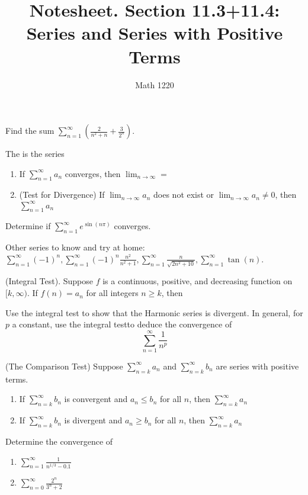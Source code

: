 \documentclass[12pt, a4paper]{article}
\author{Math 1220}
\title{Notesheet. Section 11.3+11.4: Series and Series with Positive Terms}
\date{}
\begin{document}
\maketitle
\nameline
\begin{ex}
  Find the sum \(\sum_{n=1}^\infty \left( \frac{2}{n^2+n} +
    \frac{3}{2^n} \right)\).
\end{ex}
\begin{defi}
  The  is the series
\end{defi}
\begin{thrm}
  \begin{enumerate}
  \item If \(\sum_{n=1}^\infty a_n\) converges, then \(\lim_{n \to
      \infty} = \)
  \item (Test for Divergence) If \(\lim_{n \to \infty} a_n\) does not exist or \(\lim_{n \to
    \infty} a_n \neq 0\), then \(\sum_{n=1}^\infty a_n\)
  \end{enumerate}
\end{thrm}
\begin{ex}
  Determine if \(\sum_{n=1}^\infty e^{\sin(n\pi)}\) converges.
\end{ex}
Other series to know and try at home: \(\sum_{n=1}^\infty (-1)^n,
\sum_{n=1}^\infty (-1)^n \frac{n^2}{n^2+1}, \sum_{n=1}^\infty
\frac{n}{\sqrt{2n^2+10}}, \sum_{n=1}^\infty \tan(n)\).
\begin{thrm}
  (Integral Test). Suppose \(f\) is a continuous, positive, and decreasing function on
  \([k,\infty)\). If \(f(n) = a_n\) for all integers \(n \geq k\), then 
\end{thrm}
\begin{ex}
  Use the integral test to show that the Harmonic series is
  divergent. In general, for \(p\) a constant, use the integral
  testto deduce the 
  convergence of  \[
    \sum_{n=1}^\infty \frac{1}{n^p}
  \]
\end{ex}
\begin{thrm}
  (The Comparison Test) Suppose \(\sum_{n=k}^\infty a_n\) and
  \(\sum_{n=k}^\infty b_n\) are series with positive terms.
  \begin{enumerate}
  \item If \(\sum_{n=k}^\infty b_n\) is convergent and \(a_n \leq
    b_n\) for all \(n\), then \(\sum_{n=k}^\infty a_n\)
  \item If \(\sum_{n=k}^\infty b_n\) is divergent and \(a_n \geq b_n\)
    for all \(n\), then \(\sum_{n=k}^\infty a_n\)
  \end{enumerate}
\end{thrm}
\begin{ex}
  Determine the convergence of
  \begin{enumerate}
  \item \(\sum_{n=1}^\infty \frac{1}{n^{1/3}-0.1}\)
  \item \(\sum_{n=0}^\infty \frac{2^n}{3^n + 2}\)
  \end{enumerate}
\end{ex}
\end{document}
